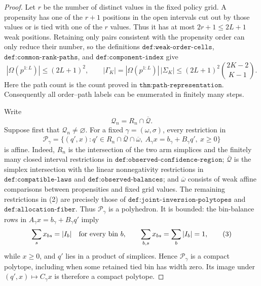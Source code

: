 \documentclass{article}
\begin{document}
\begin{proof}
Let \(r\) be the number of distinct values in the fixed policy grid.  A propensity has one of the \(r+1\) positions in the open intervals cut out by those values or is tied with one of the \(r\) values.  Thus it has at most \(2r+1\leq 2L+1\) weak positions.  Retaining only pairs consistent with the propensity order can only reduce their number, so the definitions \(\texttt{def:weak-order-cells}\), \(\texttt{def:common-rank-paths}\), and \(\texttt{def:component-index}\) give
\[
 |\Omega(p^{1:L})|\leq (2L+1)^2,
 \qquad
 |\Gamma_K|=|\Omega(p^{1:L})|\,|\Sigma_K|
 \leq (2L+1)^2\binom{2K-2}{K-1}.
 \tag{1}
\]
Here the path count is the count proved in \(\texttt{thm:path-representation}\).  Consequently all order--path labels can be enumerated in finitely many steps.

Write
\[
 \mathcal Q_n=R_n\cap\overline{\mathcal Q}.
\]
Suppose first that \(\mathcal Q_n\neq\varnothing\).  For a fixed \(\gamma=(\omega,\sigma)\), every restriction in
\[
 \mathcal P_\gamma
 =\{(q',x):q'\in R_n\cap\overline{\mathcal Q}\cap\overline\omega,
       \ A_\gamma x=b_\gamma+B_\gamma q',\ x\geq0\}
 \tag{2}
\]
is affine.  Indeed, \(R_n\) is the intersection of the two arm simplices and the finitely many closed interval restrictions in \(\texttt{def:observed-confidence-region}\); \(\overline{\mathcal Q}\) is the simplex intersection with the linear nonnegativity restrictions in \(\texttt{def:compatible-laws}\) and \(\texttt{def:observed-balances}\); and \(\overline\omega\) consists of weak affine comparisons between propensities and fixed grid values.  The remaining restrictions in (2) are precisely those of \(\texttt{def:joint-inversion-polytopes}\) and \(\texttt{def:allocation-fiber}\).  Thus \(\mathcal P_\gamma\) is a polyhedron.  It is bounded: the bin-balance rows in \(A_\gamma x=b_\gamma+B_\gamma q'\) imply
\[
 \sum_s x_{bs}=|I_b|\quad\hbox{for every bin }b,
 \qquad
 \sum_{b,s}x_{bs}=\sum_b|I_b|=1,
 \tag{3}
\]
while \(x\geq0\), and \(q'\) lies in a product of simplices.  Hence \(\mathcal P_\gamma\) is a compact polytope, including when some retained tied bin has width zero.  Its image under \((q',x)\mapsto C_\gamma x\) is therefore a compact polytope.


\end{proof}
\end{document}
